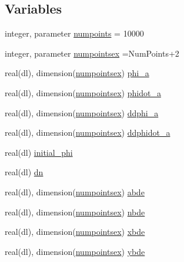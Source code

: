 \subsection*{Variables}
\begin{DoxyCompactItemize}
\item 
integer, parameter \mbox{\hyperlink{namespacequint_ab17aada00a312b3af2e4e191fdf3e50e}{numpoints}} = 10000
\item 
integer, parameter \mbox{\hyperlink{namespacequint_a8388814d2fb6e0f54431a7257a8f86a9}{numpointsex}} =Num\+Points+2
\item 
real(dl), dimension(\mbox{\hyperlink{namespacequint_a8388814d2fb6e0f54431a7257a8f86a9}{numpointsex}}) \mbox{\hyperlink{namespacequint_a061343360883da6eebfdb61cdfba449c}{phi\+\_\+a}}
\item 
real(dl), dimension(\mbox{\hyperlink{namespacequint_a8388814d2fb6e0f54431a7257a8f86a9}{numpointsex}}) \mbox{\hyperlink{namespacequint_a8719904f4c91dac880cb839088a69ca9}{phidot\+\_\+a}}
\item 
real(dl), dimension(\mbox{\hyperlink{namespacequint_a8388814d2fb6e0f54431a7257a8f86a9}{numpointsex}}) \mbox{\hyperlink{namespacequint_adb002db0bc26b007d62ea6582a5fc58f}{ddphi\+\_\+a}}
\item 
real(dl), dimension(\mbox{\hyperlink{namespacequint_a8388814d2fb6e0f54431a7257a8f86a9}{numpointsex}}) \mbox{\hyperlink{namespacequint_a4dd7a485719c132a01ed439f30c1f866}{ddphidot\+\_\+a}}
\item 
real(dl) \mbox{\hyperlink{namespacequint_a7992ff4df2efe5528a1a109c6d0533db}{initial\+\_\+phi}}
\item 
real(dl) \mbox{\hyperlink{namespacequint_af323f47cbdf135c3f3f626b07465f347}{dn}}
\item 
real(dl), dimension(\mbox{\hyperlink{namespacequint_a8388814d2fb6e0f54431a7257a8f86a9}{numpointsex}}) \mbox{\hyperlink{namespacequint_a32c8893957513fe23c9798bd01dd57bd}{abde}}
\item 
real(dl), dimension(\mbox{\hyperlink{namespacequint_a8388814d2fb6e0f54431a7257a8f86a9}{numpointsex}}) \mbox{\hyperlink{namespacequint_a772dd6340b969931fd8b4cc796e2ecee}{nbde}}
\item 
real(dl), dimension(\mbox{\hyperlink{namespacequint_a8388814d2fb6e0f54431a7257a8f86a9}{numpointsex}}) \mbox{\hyperlink{namespacequint_ac5553ef581fd33330e83b1849b3c90ff}{xbde}}
\item 
real(dl), dimension(\mbox{\hyperlink{namespacequint_a8388814d2fb6e0f54431a7257a8f86a9}{numpointsex}}) \mbox{\hyperlink{namespacequint_af164f7d3b20eb2e0ad7449519ada6734}{ybde}}

\end{DoxyCompactItemize}
